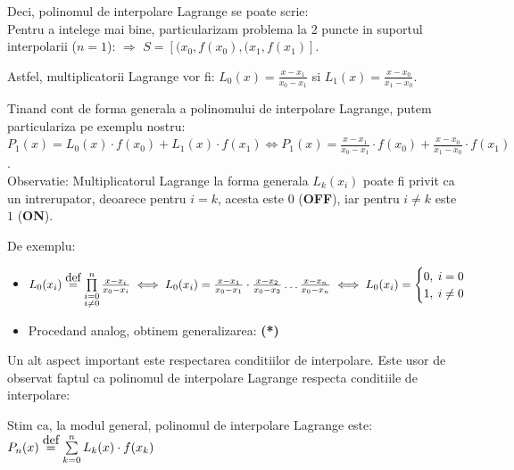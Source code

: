 \documentclass{article}
\newcommand\eqdef{\stackrel{\mathclap{\normalfont\mbox{def}}}{=}}
\begin{document}
Deci, polinomul de interpolare Lagrange se poate scrie:\: \\

Pentru a intelege mai bine, particularizam problema la 2 puncte in suportul interpolarii ($n = 1$): $\Rightarrow$ $S=[(x_0, f(x_0),(x_1, f(x_1)]$.

Astfel, multiplicatorii Lagrange vor fi: $L_0(x) = \frac{x-x_1}{x_0-x_1}$ si $L_1(x) = \frac{x-x_0}{x_1-x_0}$.

Tinand cont de forma generala a polinomului de interpolare Lagrange, putem particulariza pe exemplu nostru: $P_1(x) = L_0(x) \cdot f(x_0) + L_1(x) \cdot f(x_1) \iff P_1(x) = \frac{x-x_1}{x_0-x_1} \cdot f(x_0) + \frac{x-x_0}{x_1-x_0} \cdot f(x_1)$.\\

Observatie: Multiplicatorul Lagrange la forma generala $L_k(x_i)$ poate fi privit ca un intrerupator, deoarece pentru $i = k$, acesta este $0$ (\textbf{OFF}), iar pentru $i \neq k$ este $1$ (\textbf{ON}).

De exemplu:
\begin{itemize}
    \item $L_0(x_i) \; \eqdef \; \prod\limits_{\substack{i=0 \\ i\neq 0}}^{n} \frac{x-x_i}{x_0-x_i} \iff L_0(x_i) = \frac{x-x_1}{x_0-x_1} \cdot \frac{x-x_2}{x_0-x_2} \dots \frac{x-x_n}{x_0-x_n} \iff L_0(x_i) =
    \begin{cases}
      0,\; i = 0\\
      1,\; i \neq 0\\
    \end{cases}$
    
    \item Procedand analog, obtinem generalizarea: 
    \textbf{(*)}
\end{itemize}


Un alt aspect important este respectarea conditiilor de interpolare. Este usor de observat faptul ca polinomul de interpolare Lagrange respecta conditiile de interpolare:

Stim ca, la modul general, polinomul de interpolare Lagrange este: $P_n(x) \; \eqdef \; \sum\limits_{k=0}^{n} L_k(x) \cdot f(x_k)$
\end{document}
